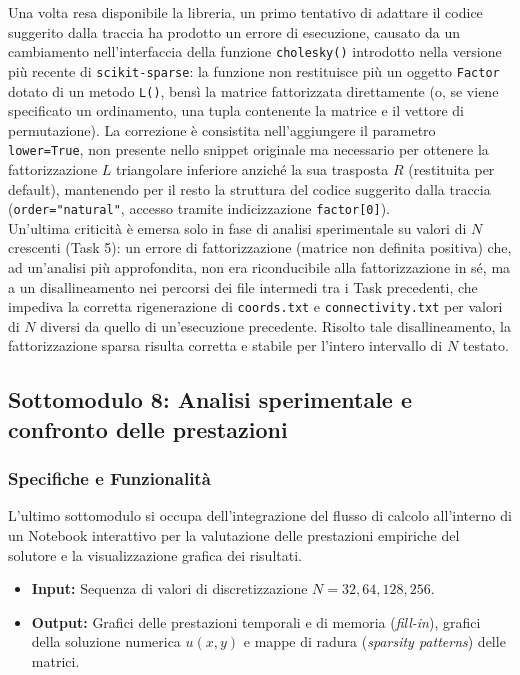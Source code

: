 \documentclass[twocolumn]{article}
\begin{document}
Una volta resa disponibile la libreria, un primo tentativo di adattare il
codice suggerito dalla traccia ha prodotto un errore di esecuzione, causato
da un cambiamento nell'interfaccia della funzione \texttt{cholesky()}
introdotto nella versione più recente di \texttt{scikit-sparse}: la funzione
non restituisce più un oggetto \texttt{Factor} dotato di un metodo
\texttt{L()}, bensì la matrice fattorizzata direttamente (o, se viene
specificato un ordinamento, una tupla contenente la matrice e il vettore di
permutazione). La correzione è consistita nell'aggiungere il parametro
\texttt{lower=True}, non presente nello snippet originale ma necessario per
ottenere la fattorizzazione $L$ triangolare inferiore anziché la sua
trasposta $R$ (restituita per default), mantenendo per il resto la struttura
del codice suggerito dalla traccia (\texttt{order="natural"}, accesso tramite
indicizzazione \texttt{factor[0]}).\\

Un'ultima criticità è emersa solo in fase di analisi sperimentale su valori
di $N$ crescenti (Task 5): un errore di fattorizzazione (matrice non definita
positiva) che, ad un'analisi più approfondita, non era riconducibile alla
fattorizzazione in sé, ma a un disallineamento nei percorsi dei file
intermedi tra i Task precedenti, che impediva la corretta rigenerazione di
\texttt{coords.txt} e \texttt{connectivity.txt} per valori di $N$ diversi da
quello di un'esecuzione precedente. Risolto tale disallineamento, la
fattorizzazione sparsa risulta corretta e stabile per l'intero intervallo di
$N$ testato.


\subsection{Sottomodulo 8: Analisi sperimentale e confronto delle prestazioni}

\subsubsection{Specifiche e Funzionalit\`a}
L'ultimo sottomodulo si occupa dell'integrazione del flusso di calcolo all'interno di un Notebook interattivo per la valutazione delle prestazioni empiriche del solutore e la visualizzazione grafica dei risultati.
\begin{itemize}
    \item \textbf{Input:} Sequenza di valori di discretizzazione $N = 32, 64, 128, 256$.
    \item \textbf{Output:} Grafici delle prestazioni temporali e di memoria (\textit{fill-in}), grafici della soluzione numerica $u(x,y)$ e mappe di radura (\textit{sparsity patterns}) delle matrici.
\end{itemize}
\end{document}
